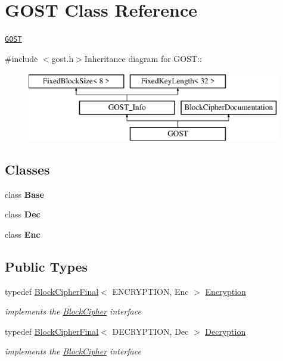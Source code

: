 \hypertarget{class_g_o_s_t}{
\section{GOST Class Reference}
\label{class_g_o_s_t}
}


\href{http://www.weidai.com/scan-mirror/cs.html#GOST}{\tt GOST}  


{\ttfamily \#include $<$gost.h$>$}Inheritance diagram for GOST::\begin{figure}[H]
\begin{center}
\leavevmode
\includegraphics[height=3cm]{class_g_o_s_t}
\end{center}
\end{figure}
\subsection*{Classes}
\begin{DoxyCompactItemize}
\item 
class {\bfseries Base}
\item 
class {\bfseries Dec}
\item 
class {\bfseries Enc}
\end{DoxyCompactItemize}
\subsection*{Public Types}
\begin{DoxyCompactItemize}
\item 
\hypertarget{class_g_o_s_t_ad8af1f5e3f471c3d5caaebaf6e171631}{
typedef \hyperlink{class_block_cipher_final}{BlockCipherFinal}$<$ ENCRYPTION, Enc $>$ \hyperlink{class_g_o_s_t_ad8af1f5e3f471c3d5caaebaf6e171631}{Encryption}}
\label{class_g_o_s_t_ad8af1f5e3f471c3d5caaebaf6e171631}

\begin{DoxyCompactList}\small\item\em implements the \hyperlink{class_block_cipher}{BlockCipher} interface \item\end{DoxyCompactList}\item 
\hypertarget{class_g_o_s_t_a7ba9eb5e8203e59dc007abe705fedfc7}{
typedef \hyperlink{class_block_cipher_final}{BlockCipherFinal}$<$ DECRYPTION, Dec $>$ \hyperlink{class_g_o_s_t_a7ba9eb5e8203e59dc007abe705fedfc7}{Decryption}}
\label{class_g_o_s_t_a7ba9eb5e8203e59dc007abe705fedfc7}

\begin{DoxyCompactList}\small\item\em implements the \hyperlink{class_block_cipher}{BlockCipher} interface \item\end{DoxyCompactList}\end{DoxyCompactItemize}


